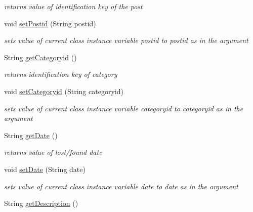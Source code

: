 \begin{DoxyCompactItemize}
\begin{DoxyCompactList}\small\item\em returns value of identification key of the post \end{DoxyCompactList}\item 
void \hyperlink{classcom_1_1example_1_1sel_1_1lostfound_1_1Posts_abb20418ea7603a545b7827b3a96ed562}{set\-Postid} (\-String postid)
\begin{DoxyCompactList}\small\item\em sets value of current class instance variable postid to postid as in the argument \end{DoxyCompactList}\item 
\hypertarget{classcom_1_1example_1_1sel_1_1lostfound_1_1Posts_ab813844b536aaa1b4adba98983ed31c0}{\-String \hyperlink{classcom_1_1example_1_1sel_1_1lostfound_1_1Posts_ab813844b536aaa1b4adba98983ed31c0}{get\-Categoryid} ()}\label{classcom_1_1example_1_1sel_1_1lostfound_1_1Posts_ab813844b536aaa1b4adba98983ed31c0}

\begin{DoxyCompactList}\small\item\em returns identification key of category \end{DoxyCompactList}\item 
void \hyperlink{classcom_1_1example_1_1sel_1_1lostfound_1_1Posts_a6196a14877b70e640f66b0d52f6f2fde}{set\-Categoryid} (\-String categoryid)
\begin{DoxyCompactList}\small\item\em sets value of current class instance variable categoryid to categoryid as in the argument \end{DoxyCompactList}\item 
\hypertarget{classcom_1_1example_1_1sel_1_1lostfound_1_1Posts_a36b2e08add75f9d3f49152457929710f}{\-String \hyperlink{classcom_1_1example_1_1sel_1_1lostfound_1_1Posts_a36b2e08add75f9d3f49152457929710f}{get\-Date} ()}\label{classcom_1_1example_1_1sel_1_1lostfound_1_1Posts_a36b2e08add75f9d3f49152457929710f}

\begin{DoxyCompactList}\small\item\em returns value of lost/found date \end{DoxyCompactList}\item 
void \hyperlink{classcom_1_1example_1_1sel_1_1lostfound_1_1Posts_afb4ab303bdddcd10ae0b68fba6452620}{set\-Date} (\-String date)
\begin{DoxyCompactList}\small\item\em sets value of current class instance variable date to date as in the argument \end{DoxyCompactList}\item 
\hypertarget{classcom_1_1example_1_1sel_1_1lostfound_1_1Posts_aff5ef85abebc21f81f7e375c22ae8557}{\-String \hyperlink{classcom_1_1example_1_1sel_1_1lostfound_1_1Posts_aff5ef85abebc21f81f7e375c22ae8557}{get\-Description} ()}\label{classcom_1_1example_1_1sel_1_1lostfound_1_1Posts_aff5ef85abebc21f81f7e375c22ae8557}


\end{DoxyCompactItemize}
